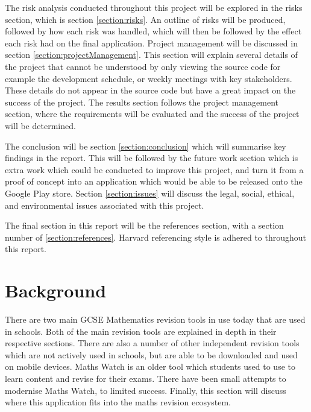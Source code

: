 \documentclass{article}
\begin{document}
The risk analysis conducted throughout this project will be explored in the risks section, which is section \ref{section:risks}. An outline of risks will be produced, followed by how each risk was handled, which will then be followed by the effect each risk had on the final application. Project management will be discussed in section \ref{section:projectManagement}. This section will explain several details of the project that cannot be understood by only viewing the source code for example the development schedule, or weekly meetings with key stakeholders. These details do not appear in the source code but have a great impact on the success of the project. The results section follows the project management section, where the requirements will be evaluated and the success of the project will be determined. \par

The conclusion will be section \ref{section:conclusion} which will summarise key findings in the report. This will be followed by the future work section which is extra work which could be conducted to improve this project, and turn it from a proof of concept into an application which would be able to be released onto the Google Play store. Section \ref{section:issues} will discuss the legal, social, ethical, and environmental issues associated with this project. \par

The final section in this report will be the references section, with a section number of \ref{section:references}. Harvard referencing style is adhered to throughout this report.\par

\section{Background}
\label{section:background}

There are two main GCSE Mathematics revision tools in use today that are used in schools. Both of the main revision tools are explained in depth in their respective sections. There are also a number of other independent revision tools which are not actively used in schools, but are able to be downloaded and used on mobile devices. Maths Watch is an older tool which students used to use to learn content and revise for their exams. There have been small attempts to modernise Maths Watch, to limited success. Finally, this section will discuss where this application fits into the maths revision ecosystem. \par
\end{document}

